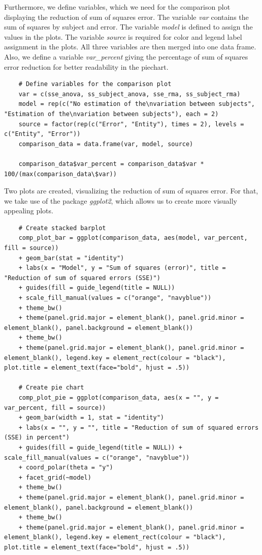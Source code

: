 \documentclass[11pt]{article}
\begin{document}
	Furthermore, we define variables, which we need for the comparison plot displaying the reduction of sum of squares error. The variable \textit{var} contains the sum of squares by subject and error. The variable \textit{model} is defined to assign the values in the plots. The variable \textit{source} is required for color and legend label assignment in the plots. All three variables are then merged into one data frame. Also, we define a variable \textit{var\_percent} giving the percentage of sum of squares error reduction for better readability in the piechart.
	
	\begin{lstlisting}	
	# Define variables for the comparison plot
	var = c(sse_anova, ss_subject_anova, sse_rma, ss_subject_rma)
	model = rep(c("No estimation of the\nvariation between subjects", "Estimation of the\nvariation between subjects"), each = 2)
	source = factor(rep(c("Error", "Entity"), times = 2), levels = c("Entity", "Error"))
	comparison_data = data.frame(var, model, source)
	
	comparison_data$var_percent = comparison_data$var * 100/(max(comparison_data\$var)) 
	\end{lstlisting}        
	
	
	Two plots are created, visualizing the reduction of sum of squares error. For that, we take use of the package \textit{ggplot2}, which allows us to create more visually appealing plots.
	
	
	\begin{lstlisting}  		
	# Create stacked barplot 
	comp_plot_bar = ggplot(comparison_data, aes(model, var_percent, fill = source)) 
	+ geom_bar(stat = "identity") 
	+ labs(x = "Model", y = "Sum of squares (error)", title = "Reduction of sum of squared errors (SSE)") 
	+ guides(fill = guide_legend(title = NULL)) 
	+ scale_fill_manual(values = c("orange", "navyblue")) 
	+ theme_bw() 
	+ theme(panel.grid.major = element_blank(), panel.grid.minor = element_blank(), panel.background = element_blank()) 
	+ theme_bw() 
	+ theme(panel.grid.major = element_blank(), panel.grid.minor = element_blank(), legend.key = element_rect(colour = "black"), plot.title = element_text(face="bold", hjust = .5))
	
	# Create pie chart    
	comp_plot_pie = ggplot(comparison_data, aes(x = "", y = var_percent, fill = source)) 
	+ geom_bar(width = 1, stat = "identity") 
	+ labs(x = "", y = "", title = "Reduction of sum of squared errors (SSE) in percent") 
	+ guides(fill = guide_legend(title = NULL)) + scale_fill_manual(values = c("orange", "navyblue")) 
	+ coord_polar(theta = "y") 
	+ facet_grid(~model) 
	+ theme_bw() 
	+ theme(panel.grid.major = element_blank(), panel.grid.minor = element_blank(), panel.background = element_blank()) 
	+ theme_bw() 
	+ theme(panel.grid.major = element_blank(), panel.grid.minor = element_blank(), legend.key = element_rect(colour = "black"), plot.title = element_text(face="bold", hjust = .5))
	
	\end{lstlisting}      
	
\end{document}
